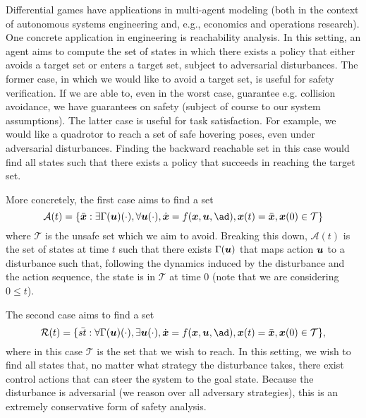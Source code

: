 Differential games have applications in multi-agent modeling (both in the context of autonomous systems engineering and, e.g., economics and operations research). One concrete application in engineering is reachability analysis. In this setting, an agent aims to compute the set of states in which there exists a policy that either avoids a target set or enters a target set, subject to adversarial disturbances. The former case, in which we would like to avoid a target set, is useful for safety verification. If we are able to, even in the worst case, guarantee e.g. collision avoidance, we have guarantees on safety (subject of course to our system assumptions). The latter case is useful for task satisfaction. For example, we would like a quadrotor to reach a set of safe hovering poses, even under adversarial disturbances. Finding the backward reachable set in this case would find all states such that there exists a policy that succeeds in reaching the target set. 

More concretely, the first case aims to find a set 
\begin{equation}
    \mathcal{A}(t) = \{\bar{\st} : \exists \Gamma(\ac)(\cdot), \forall \ac(\cdot), \stdot = \f(\st,\ac,\ad), \st(t) = \bar{\st}, \st(0) \in \mathcal{T}\}
\end{equation}
where $\mathcal{T}$ is the unsafe set which we aim to avoid. Breaking this down, $\mathcal{A}(t)$ is the set of states at time $t$ such that there exists $\Gamma(\bm{u})$ that maps action $\bm{u}$ to a disturbance such that, following the dynamics induced by the disturbance and the action sequence, the state is in $\mathcal{T}$ at time $0$ (note that we are considering $0 \leq t$).

The second case aims to find a set 
\begin{equation}
\mathcal{R}(t) = \{\bar{st} : \forall \Gamma(\ac)(\cdot), \exists \ac(\cdot), \stdot = \f(\st,\ac,\ad), \st(t) = \bar{\st}, \st(0) \in \mathcal{T}\},
\end{equation}
where in this case $\mathcal{T}$ is the set that we wish to reach. In this setting, we wish to find all states that, no matter what strategy the disturbance takes, there exist control actions that can steer the system to the goal state. Because the disturbance is adversarial (we reason over all adversary strategies), this is an extremely conservative form of safety analysis. 

